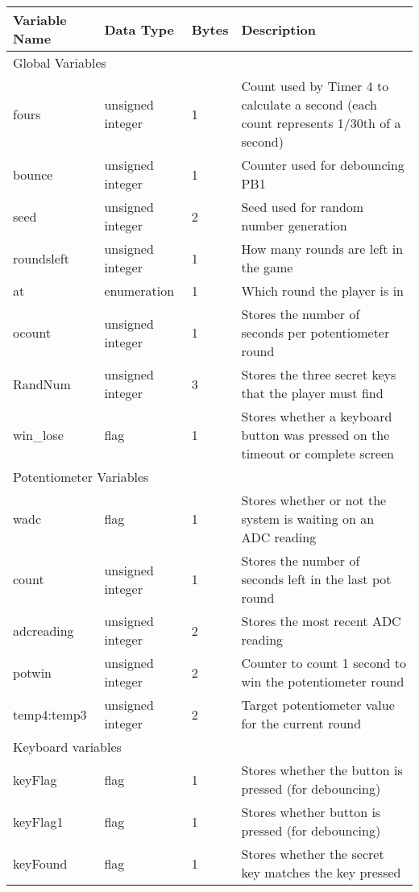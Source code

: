\documentclass[a4paper]{article}
\begin{document}
\begin{table}[H]
\centering
\label{tbl:dict}
\begin{tabular}{@{}lllp{9cm}@{}}
\toprule
Variable Name & Data Type        & Bytes & Description \\ \midrule
\multicolumn{4}{l}{Global Variables} \\ \midrule
fours         & unsigned integer & 1     & Count used by Timer 4 to calculate a second (each count represents 1/30th of a second) \\
bounce        & unsigned integer & 1     & Counter used for debouncing PB1 \\
seed          & unsigned integer & 2     & Seed used for random number generation \\
roundsleft    & unsigned integer & 1     & How many rounds are left in the game \\
at            & enumeration      & 1     & Which round the player is in \\
ocount        & unsigned integer & 1     & Stores the number of seconds per potentiometer round \\
RandNum		  & unsigned integer & 3	& Stores the three secret keys that the player must find\\
win\_lose 	  & flag 			 & 1	 & Stores whether a keyboard button was pressed on the timeout or complete screen\\ \midrule
\multicolumn{4}{l}{Potentiometer Variables} \\ \midrule
wadc          & flag             & 1     & Stores whether or not the system is waiting on an ADC reading \\
count         & unsigned integer & 1     & Stores the number of seconds left in the last pot round \\
adcreading	& unsigned integer	& 2 & Stores the most recent ADC reading \\  
potwin		& unsigned integer	& 2	& Counter to count 1 second to win the potentiometer round \\ 
temp4:temp3	& unsigned integer	& 2	& Target potentiometer value for the current round \\ \midrule
\multicolumn{4}{l}{Keyboard variables} \\ \midrule
keyFlag 	 & flag				& 1 & Stores whether the button is pressed (for debouncing)\\
keyFlag1	 & flag				& 1 & Stores whether button is pressed (for debouncing) \\ 
keyFound	 & flag				& 1 & Stores whether the secret key matches the key pressed\\

\end{tabular}
\end{table}
\end{document}
